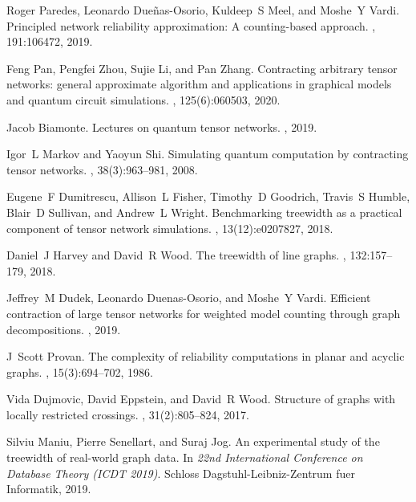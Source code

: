 \documentclass[12pt,twocolumn]{article}
\begin{document}
{\begin{thebibliography}{10}
Roger Paredes, Leonardo Due{\~n}as-Osorio, Kuldeep~S Meel, and Moshe~Y Vardi.
\newblock Principled network reliability approximation: A counting-based
  approach.
, 191:106472, 2019.

Feng Pan, Pengfei Zhou, Sujie Li, and Pan Zhang.
\newblock Contracting arbitrary tensor networks: general approximate algorithm
  and applications in graphical models and quantum circuit simulations.
, 125(6):060503, 2020.

Jacob Biamonte.
\newblock Lectures on quantum tensor networks.
, 2019.

Igor~L Markov and Yaoyun Shi.
\newblock Simulating quantum computation by contracting tensor networks.
, 38(3):963--981, 2008.

Eugene~F Dumitrescu, Allison~L Fisher, Timothy~D Goodrich, Travis~S Humble,
  Blair~D Sullivan, and Andrew~L Wright.
\newblock Benchmarking treewidth as a practical component of tensor network
  simulations.
, 13(12):e0207827, 2018.

Daniel~J Harvey and David~R Wood.
\newblock The treewidth of line graphs.
, 132:157--179, 2018.

Jeffrey~M Dudek, Leonardo Duenas-Osorio, and Moshe~Y Vardi.
\newblock Efficient contraction of large tensor networks for weighted model
  counting through graph decompositions.
, 2019.

J~Scott Provan.
\newblock The complexity of reliability computations in planar and acyclic
  graphs.
, 15(3):694--702, 1986.

Vida Dujmovic, David Eppstein, and David~R Wood.
\newblock Structure of graphs with locally restricted crossings.
, 31(2):805--824, 2017.

Silviu Maniu, Pierre Senellart, and Suraj Jog.
\newblock An experimental study of the treewidth of real-world graph data.
\newblock In {\em 22nd International Conference on Database Theory (ICDT
  2019)}. Schloss Dagstuhl-Leibniz-Zentrum fuer Informatik, 2019.


\end{thebibliography}}
\end{document}
